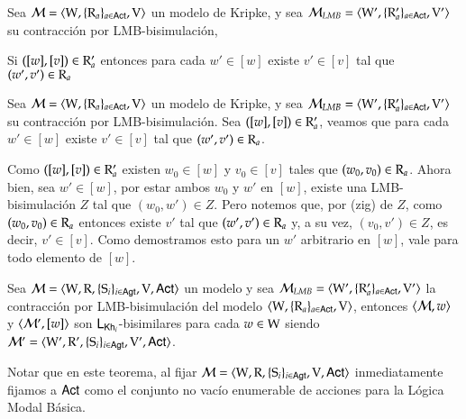 \begin{lema}
    Sea $\mathcal{M} = \langle \mathrm{W},\{\mathrm{R}_a\}_{a\in{\rm \sf Act}},\mathrm{V} \rangle$ un modelo de Kripke, y sea $\mathcal{M}_{LMB} = \langle \mathrm{W}',\{\mathrm{R}_a'\}_{a\in{\rm \sf Act}},\mathrm{V}' \rangle$ su contracción por LMB-bisimulación,
    \begin{center}
        Si $([w],[v]) \in \mathrm{R}'_a$ entonces para cada $w' \in [w]$ existe $v' \in [v]$ tal que $(w',v') \in \mathrm{R}_a$
    \end{center}
\end{lema}



\begin{demostracion}
    Sea $\mathcal{M} = \langle \mathrm{W},\{\mathrm{R}_a\}_{a\in{\rm \sf Act}},\mathrm{V} \rangle$ un modelo de Kripke, y sea $\mathcal{M}_{LMB} = \langle \mathrm{W}',\{\mathrm{R}_a'\}_{a\in{\rm \sf Act}},\mathrm{V}' \rangle$ su contracción por LMB-bisimulación. Sea $([w],[v]) \in \mathrm{R}'_a$, veamos que para cada $w' \in [w]$ existe $v' \in [v]$ tal que $(w',v') \in \mathrm{R}_a$.

    Como $([w],[v]) \in \mathrm{R}'_a$ existen $w_0 \in [w]$ y $v_0 \in [v]$ tales que $(w_0,v_0)\in \mathrm{R}_a$. Ahora bien, sea $w' \in [w]$, por estar ambos $w_0$ y $w'$ en $[w]$, existe una LMB-bisimulación $Z$ tal que $(w_0,w') \in Z$. Pero notemos que, por (zig) de $Z$, como $(w_0,v_0) \in \mathrm{R}_a$  entonces existe $v'$ tal que $(w',v') \in \mathrm{R}_a$ y, a su vez, $(v_0,v') \in Z$, es decir, $v' \in [v]$. Como demostramos esto para un $w'$ arbitrario en $[w]$, vale para todo elemento de $[w]$.
\end{demostracion}


\begin{teorema}
    Sea $\mathcal{M}=\langle \mathrm{W},\mathrm{R},\{ \mathrm{S}_i \}_{i \in {\rm \sf Agt}},\mathrm{V},{\rm \sf Act} \rangle$ un modelo y sea $\mathcal{M}_{LMB} = \langle \mathrm{W}',\{\mathrm{R}_a'\}_{a\in{\rm \sf Act}},\mathrm{V}' \rangle$ la contracción por LMB-bisimulación del modelo $\langle \mathrm{W},\{\mathrm{R}_a\}_{a\in{\rm \sf Act}},\mathrm{V} \rangle$, entonces $\langle \mathcal{M},w \rangle$ y $\langle \mathcal{M}',[w] \rangle$ son $\mathsf{L}_{\mathsf{Kh}_i}$-bisimilares para cada $w \in \mathrm{W}$ siendo $\mathcal{M}' = \langle \mathrm{W}',\mathrm{R}',\{ \mathrm{S}_i \}_{i \in {\rm \sf Agt}},\mathrm{V}',{\rm \sf Act} \rangle$.
\end{teorema}

Notar que en este teorema, al fijar $\mathcal{M}=\langle \mathrm{W},\mathrm{R},\{ \mathrm{S}_i \}_{i \in {\rm \sf Agt}},\mathrm{V},{\rm \sf Act} \rangle$ inmediatamente fijamos a ${\rm \sf Act}$ como el conjunto no vacío enumerable de acciones para la Lógica Modal Básica.

